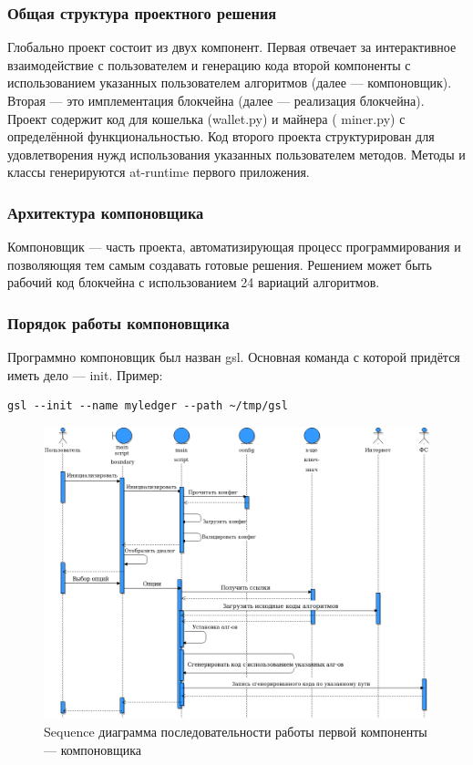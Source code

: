 \subsubsection{Общая структура проектного решения}
Глобально проект состоит из двух компонент. Первая отвечает за интерактивное
взаимодействие с пользователем и генерацию кода второй компоненты с
использованием указанных пользователем алгоритмов (далее --- компоновщик).
Вторая --- это имплементация блокчейна (далее --- реализация блокчейна).
Проект содержит код для кошелька ({\small wallet.py}) и майнера ({\small
miner.py}) с определённой функциональностью. Код второго проекта структурирован
для удовлетворения нужд использования указанных пользователем методов. Методы и
классы генерируются at-runtime первого приложения.



\subsubsection{Архитектура компоновщика}
Компоновщик --- часть проекта, автоматизирующая процесс программирования и
позволяющяя тем самым создавать готовые решения. Решением может быть рабочий
код блокчейна с использованием 24 вариаций алгоритмов.

\subsubsection{Порядок работы компоновщика}
Программно компоновщик был назван {\small gsl}. Основная команда с которой
придётся иметь дело --- init. Пример:\\

\begin{center}
\begin{Verbatim}[frame=single]
gsl --init --name myledger --path ~/tmp/gsl
\end{Verbatim}
\end{center}

\begin{figure}[h]
    \centering
    \includegraphics[width=\textwidth]{images/sequence}
    \caption{Sequence диаграмма последовательности работы первой компоненты --- компоновщика}\label{sequence}
\end{figure}

